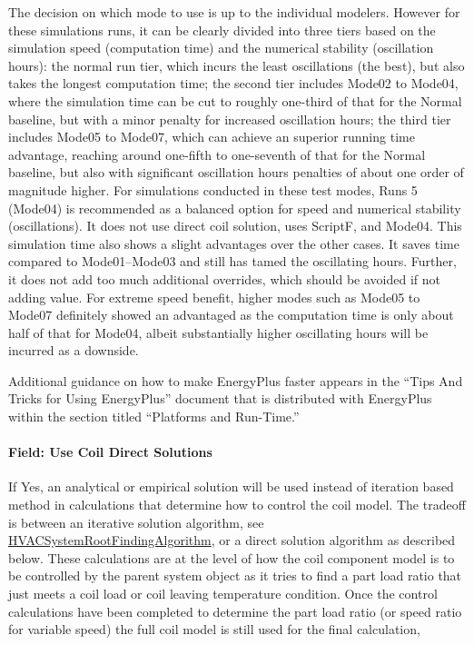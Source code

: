 The decision on which mode to use is up to the individual modelers. However for these simulations runs, it can be clearly divided into three tiers based on the simulation speed (computation time) and the numerical stability (oscillation hours): the normal run tier, which incurs the least oscillations (the best), but also takes the longest computation time; the second tier includes Mode02 to Mode04, where the simulation time can be cut to roughly one-third of that for the Normal baseline, but with a minor penalty for increased oscillation hours; the third tier includes Mode05 to Mode07, which can achieve an superior running time advantage, reaching around one-fifth to one-seventh of that for the Normal baseline, but also with significant oscillation hours penalties of about one order of magnitude higher. For simulations conducted in these test modes, Runs 5 (Mode04) is recommended as a balanced option for speed and numerical stability (oscillations). It does not use direct coil solution, uses ScriptF, and Mode04. This simulation time also shows a slight advantages over the other cases. It saves time compared to Mode01--Mode03 and still has tamed the oscillating hours. Further, it does not add too much additional overrides, which should be avoided if not adding value.  For extreme speed benefit, higher modes such as Mode05 to Mode07 definitely showed an advantaged as the computation time is only about half of that for Mode04, albeit substantially higher oscillating hours will be incurred as a downside.

Additional guidance on how to make EnergyPlus faster appears in the ``Tips And Tricks for Using EnergyPlus'' document that is distributed with EnergyPlus within the section titled ``Platforms and Run-Time.''

\paragraph{Field: Use Coil Direct Solutions}\label{use-coil-direct-solutions}

If Yes, an analytical or empirical solution will be used instead of iteration based method in calculations that determine how to control the coil model.  The tradeoff is between an iterative solution algorithm, see \hyperref[hvacystemrootfindingalgorithm]{HVACSystemRootFindingAlgorithm}, or a direct solution algorithm as described below.  These calculations are at the level of how the coil component model is to be controlled by the parent system object as it tries to find a part load ratio that just meets a coil load or coil leaving temperature condition.  Once the control calculations have been completed to determine the part load ratio (or speed ratio for variable speed) the full coil model is still used for the final calculation,

